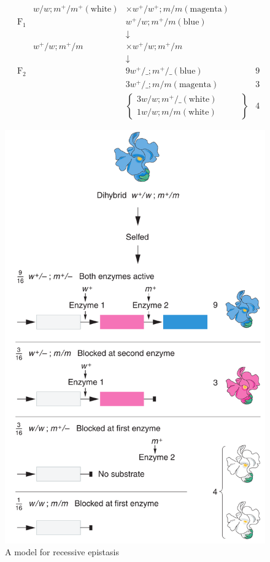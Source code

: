\documentclass[11pt,dvipsnames,ignorenonframetext,aspectratio=169]{beamer}
\begin{document}
\begin{frame}{}
\protect\hypertarget{section-15}{}
\[
\begin{aligned}
& & w/w; m^+/m^+ (\text{white}) & \times w^+/w^+; m/m (\text{magenta}) &\\
& \mathrm{F_1} & & w^+/w; m^+/m (\text{blue}) & \\
& & & \downarrow & \\
& & w^+/w; m^+/m &\times w^+/w; m^+/m & \\
& & & \downarrow & \\
& \mathrm{F_2} & & 9w^+/\_; m^+/\_ (\text{blue}) \hspace{1cm} & 9 \\
& & & 3 w^+/\_; m/m (\text{magenta}) \hspace{1cm} & 3 \\
& & & \left\{
\begin{array}{ll}
3 w/w; m^+/\_ (\text{white}) \hspace{1cm} \\
1 w/w; m/m (\text{white})
\end{array}
\right\} & 4
\end{aligned}
\]
\end{frame}

\begin{frame}{}
\protect\hypertarget{section-16}{}
\begin{figure}

{\centering \includegraphics[width=0.3\linewidth]{./../images/recessive_epistasis} 

}

\caption{A model for recessive epistasis}\label{fig:recessive-epistasis}
\end{figure}
\end{frame}
\end{document}
